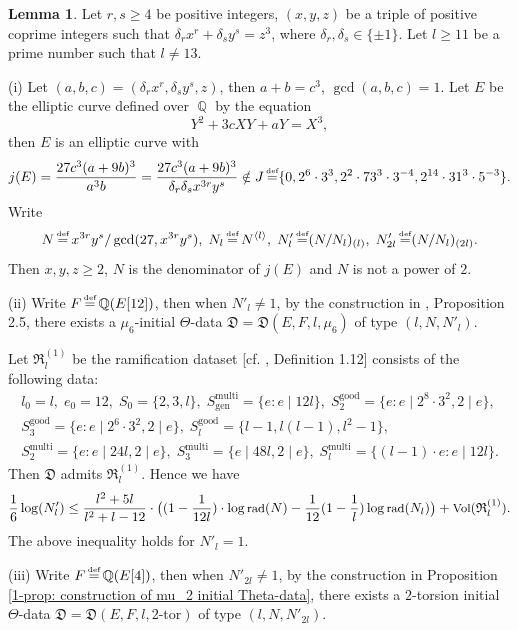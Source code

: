 \documentclass[a4paper, 12pt]{article}
\DeclareMathOperator{\defeq}{\overset{\text{\tiny{def}}}{=}}
\DeclareMathOperator{\Q}{\mathbb{Q}}
\DeclareMathOperator{\rad}{\text{rad}}
\DeclareMathOperator{\good}{\text{good}}
\DeclareMathOperator{\multi}{\text{multi}}
\DeclareMathOperator{\gen}{\text{gen}}
\DeclareMathOperator{\Vol}{\text{Vol}}
\newcommand{\lagl}{\langle l \rangle}
\numberwithin{equation}{section}
\theoremstyle{definition}
\newtheorem{lem}[thm]{Lemma}
\begin{document}
\begin{lem}  \label{4-1-lem-1}
Let $r,s \ge 4$ be positive integers, $(x,y,z)$ be a triple of positive coprime integers such that $\delta_r x^r + \delta_s y^s = z^3$, where $\delta_r,\delta_s \in \{\pm 1\}$. 
Let $l\ge 11$ be a prime number such that $l\neq 13$.

(i) Let $(a,b,c) = (\delta_r x^r, \delta_s y^s, z)$, then $a + b = c^3$, $\gcd(a,b,c) = 1$.
Let $E$ be the elliptic curve defined over $\Q$ by the equation 
$$Y^2 + 3cXY + aY= X^3,$$
then $E$ is an elliptic curve with 
$$ j(E) = \frac{27 c^3 (a+9b)^3}{a^3 b} = \frac{27 c^3 (a+9b)^3}{\delta_r \delta_s x^{3r} y^s} \notin J \defeq \{0,2^6\cdot 3^3,2^2\cdot 73^3\cdot 3^{-4},2^{14}\cdot 31^3\cdot 5^{-3}\} .$$
Write 
$$N \defeq x^{3r} y^s / \gcd(27, x^{3r} y^s), \; N_l \defeq N^{\lagl}, \; N'_l \defeq (N/N_l)_{(l)}, \;  N'_{2l} \defeq (N/N_l)_{(2l)}. $$
Then $x,y,z \ge 2$, $N$ is the denominator of $j(E)$ and $N$ is not a power of $2$.

(ii) Write $F\defeq \Q(E[12])$,
then when $N'_l \neq 1$, by the construction in \cite{Diophantine_after_IUT_I}, Proposition 2.5, there exists a $\mu_6$-initial $\Theta$-data $\mathfrak D = \mathfrak D(E,F,l,\mu_6)$ of type $(l, N, N'_l)$.

Let $\mathfrak{R}_l^{(1)}$ be the ramification dataset [cf. \cite{Diophantine_after_IUT_I}, Definition 1.12] consists of the following data:
\begin{gather*}
l_0 = l, \;  e_0 = 12, \; S_0=\{2,3,l\}, \; S_{\gen}^{\multi} = \{e: e\mid 12 l \},  \;
S_2^{\good} = \{e: e\mid 2^8\cdot 3^2, 2\mid e\}, \\ 
S_3^{\good} = \{e: e\mid 2^6\cdot 3^2, 2\mid e\}, \;
S_l^{\good} = \{l-1, l(l-1), l^2-1\}, \\
S_2^{\multi} = \{e: e\mid 24l, 2\mid e\}, \; S_3^{\multi} = \{e\mid 48l, 2\mid e\}, \;
S_l^{\multi} = \{(l-1)\cdot e: e\mid 12l\} .
\end{gather*}
Then $\mathfrak D$ admits $\mathfrak R_l^{(1)}$.
Hence we have 
\begin{equation} \small \label{4-1-eq1}
\frac{1}{6}\log(N'_l) \le  \frac{l^2+5l}{l^2+l-12}\cdot \big( (1-\frac{1}{12  l})\cdot \log\rad(N) - \frac{1}{12}(1- \frac{1}{l}) \log\rad(N_l) \big) + \Vol( \mathfrak R_l^{(1)} ).
\end{equation}
The above inequality holds for $N'_l = 1$.

(iii) Write $F\defeq \Q(E[4])$,
then when $N'_{2l} \neq 1$, by the construction in Proposition \ref{1-prop: construction of mu_2 initial Theta-data}, there exists a $2$-torsion initial $\Theta$-data $\mathfrak D = \mathfrak D(E,F,l,2\text{-tor})$ of type $(l, N, N'_{2l})$.


\end{lem}
\end{document}
